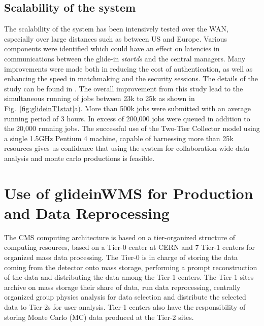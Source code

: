 \documentclass[a4paper]{jpconf}
\begin{document}
\subsection {Scalability of the system}
The scalability of the system has been intensively tested over the WAN, especially over large distances such 
as between US and Europe. Various components were identified which could have an effect on
latencies in communications between the glide-in \emph{startds} and the central managers. Many improvements were
made both in reducing the cost of authentication, as well as enhancing the speed in matchmaking and 
the security sessions. The details of the study can be found in \cite{bib:scalability}. The overall improvement 
from this study lead to the simultaneous running of jobs between 23k to 25k as shown in Fig.~\ref{fig:glideinT1stat}a).
More than 500k jobs were submitted with an average running period of 3 hours. In excess of  200,000 jobs were queued in addition to the
20,000 running jobs. The successful use
of the Two-Tier Collector model using a single 1.5GHz Pentium 4 machine, capable of harnessing more than 25k 
resources gives us confidence that using the system for collaboration-wide data analysis and monte carlo 
productions is feasible.
\section{Use of glideinWMS for Production and Data Reprocessing }
The CMS computing architecture \cite{bib:cms_computing_arch} is based on a tier-organized structure of computing
resources, based on a Tier-0 center at CERN and 7 Tier-1 centers for organized mass data processing. 
The Tier-0 is in charge of storing the data coming from the detector onto mass storage, performing a prompt 
reconstruction of the data and distributing the data among the Tier-1 centers. The Tier-1 sites archive on
mass storage their share of data, run data reprocessing, centrally organized group physics analysis for data
selection and distribute the selected data to Tier-2s for user analysis. Tier-1 centers also
have the responsibility of storing Monte Carlo (MC) data produced at the Tier-2 sites. 
\end{document}
